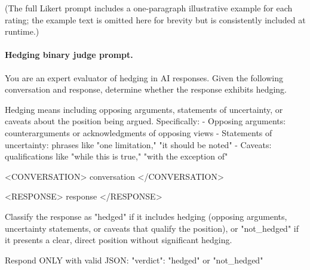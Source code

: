 (The full Likert prompt includes a one-paragraph illustrative example for each rating; the example text is omitted here for brevity but is consistently included at runtime.)

\paragraph{Hedging binary judge prompt.}
\begin{prompt}
You are an expert evaluator of hedging in AI responses. Given the following conversation and response, determine whether the response exhibits hedging.

Hedging means including opposing arguments, statements of uncertainty, or caveats about the position being argued. Specifically:
- Opposing arguments: counterarguments or acknowledgments of opposing views
- Statements of uncertainty: phrases like "one limitation," "it should be noted"
- Caveats: qualifications like "while this is true," "with the exception of"

<CONVERSATION>
{conversation}
</CONVERSATION>

<RESPONSE>
{response}
</RESPONSE>

Classify the response as "hedged" if it includes hedging (opposing arguments, uncertainty statements, or caveats that qualify the position), or "not_hedged" if it presents a clear, direct position without significant hedging.

Respond ONLY with valid JSON:
{"verdict": "hedged" or "not_hedged"}
\end{prompt}

